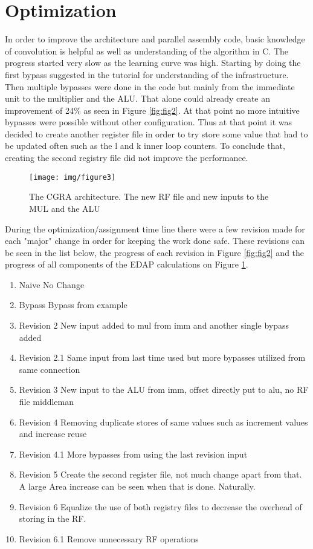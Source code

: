 \documentclass[10pt]{IEEEtran}
\begin{document}
\section{Optimization}

In order to improve the architecture and parallel assembly code, basic knowledge of convolution is helpful as well as understanding of the algorithm in C. The progress started very slow as the learning curve was high. Starting by doing the first bypass suggested in the tutorial for understanding of the infrastructure. Then multiple bypasses were done in the code but mainly from the immediate unit to the multiplier and the ALU. That alone could already create an improvement of 24\% as seen in Figure \ref{fig:fig2}. At that point no more intuitive bypasses were possible without other configuration. Thus at that point it was decided to create another register file in order to try store some value that had to be updated often such as the l and k inner loop counters. To conclude that, creating the second registry file did not improve the performance. 

\begin{figure}[h]
	\begin{center}
		\texttt{[image: img/figure3]}
		\caption{The CGRA architecture. The new RF file and new inputs to the MUL and the ALU}
		\label{fig:fig3}
	\end{center}
\end{figure}

\vspace{3em}

During the optimization/assignment time line there were a few revision made for each "major" change in order for keeping the work done safe. These revisions can be seen in the list below, the progress of each revision in Figure \ref{fig:fig2} and the progress of all components of the EDAP calculations on Figure \ref{fig:fig3}.

\begin{enumerate}
	\item Naive  No Change	
	\item Bypass Bypass from example	
	\item Revision 2 New input added to mul from imm and another single bypass added
	\item Revision 2.1 Same input from last time used but more bypasses utilized from same connection
	\item Revision 3 New input to the ALU from imm, offset directly put to alu, no RF file middleman
	\item Revision 4 Removing duplicate stores of same values such as increment values and increase reuse
	\item Revision 4.1 More bypasses from using the last revision input
	\item Revision 5 Create the second register file, not much change apart from that. A large Area increase can be seen when that is done. Naturally.
	\item Revision 6 Equalize the use of both registry files to decrease the overhead of storing in the RF.
	\item Revision 6.1 Remove unnecessary RF operations
\end{enumerate}
\end{document}
